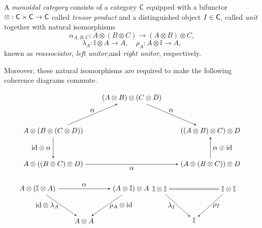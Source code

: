 \begin{definition}
  A \emph{monoidal category} consists of a category $\mathsf{C}$ equipped with a bifunctor $\otimes : \mathsf{C} \times \mathsf{C} \to \mathsf{C}$
called \emph{tensor product} and a distinguished object $I \in \mathsf{C}$, called \emph{unit} together with natural isomorphisms
\[
\alpha_{A,B,C} : A \otimes (B \otimes C) \rightarrow (A \otimes B) \otimes C,
\]
\[
\lambda_A :\mathbb{I}\otimes A \rightarrow A, \quad \rho_A : A \otimes\mathbb{I}\rightarrow A,
\]
known as \emph{reassociator}, \emph{left unitor},and \emph{right unitor}, respectively.

Moreover, these natural isomorphisms are required to make the following coherence diagrams commute.
\[
\begin{tikzpicture}
  \matrix (m) [matrix of math nodes,row sep=3em,column sep=2em,minimum width=1em]
  {
    & (A \otimes B) \otimes (C \otimes D) & \\
   A \otimes (B \otimes (C \otimes D)) &  & ((A \otimes B) \otimes C) \otimes D  \\
    A \otimes ((B \otimes C) \otimes D)  & &  (A \otimes (B \otimes C)) \otimes D \\
  };
  \path[-stealth]
    (m-1-2) edge  node [above] {$\alpha$} (m-2-3)
    (m-3-3) edge  node [right] {$\alpha \otimes \id$} (m-2-3)
    (m-3-1) edge  node [below] {$\alpha$} (m-3-3)
    (m-2-1) edge  node [left] {$\id \otimes \alpha$} (m-3-1)
    (m-2-1) edge  node [above] {$\alpha$} (m-1-2)
    ;
\end{tikzpicture}
\]


\[
\begin{minipage}{0.45\textwidth}
\centering
\begin{tikzpicture}
  \matrix (m) [matrix of math nodes,row sep=3em,column sep=2em,minimum width=1em]
  {
    A \otimes (\mathbb{I} \otimes A) &   & (A \otimes \mathbb{I}) \otimes A \\
     & A \otimes A & \\
  };
  \path[-stealth]
    (m-1-1) edge  node [above] {$\alpha$} (m-1-3)
    (m-1-1) edge  node [left] {$\id \otimes \lambda_A$} (m-2-2)
    (m-1-3) edge  node [right] {$\rho_A \otimes \id$} (m-2-2);
\end{tikzpicture}
\end{minipage}
\quad \quad
\begin{minipage}{0.45\textwidth}
\centering
\begin{tikzpicture}
  \matrix (m) [matrix of math nodes,row sep=3em,column sep=3em,minimum width=1em]
  {
   \mathbb{I}\otimes\mathbb{I}&   &\mathbb{I}\otimes\mathbb{I} \\
     &\mathbb{I}& \\
  };
  \path[-stealth]
    (m-1-1) edge  node [left] {$\lambda_I$} (m-2-2)
    (m-1-3) edge  node [right] {$\rho_I$} (m-2-2);
  \draw[double equal sign distance] (m-1-1) -- (m-1-3);
\end{tikzpicture}
\end{minipage}
\]

\end{definition}






